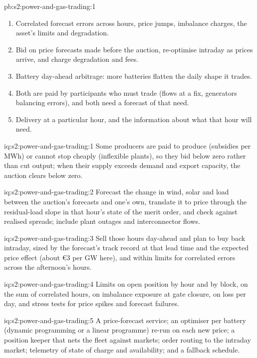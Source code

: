 \begin{solution}{pb:s2:power-and-gas-trading:1}
\begin{enumerate}
\item Correlated forecast errors across hours, price jumps, imbalance charges, the asset's limits and degradation.
\item Bid on price forecasts made before the auction, re-optimise intraday as prices arrive, and charge degradation and fees.
\item Battery day-ahead arbitrage: more batteries flatten the daily shape it trades.
\item Both are paid by participants who must trade (flows at a fix, generators balancing errors), and both need a forecast of that need.
\item Delivery at a particular hour, and the information about what that hour will need.
\end{enumerate}
\end{solution}

\begin{solution}{iq:s2:power-and-gas-trading:1}
Some producers are paid to produce (subsidies per MWh) or cannot stop cheaply (inflexible plants), so they bid below zero rather than cut output; when
their supply exceeds demand and export capacity, the auction clears below zero.
\end{solution}

\begin{solution}{iq:s2:power-and-gas-trading:2}
Forecast the change in wind, solar and load between the auction's forecasts and one's own, translate it to price through the residual-load slope in
that hour's state of the merit order, and check against realised spreads; include plant outages and interconnector flows.
\end{solution}

\begin{solution}{iq:s2:power-and-gas-trading:3}
Sell those hours day-ahead and plan to buy back intraday, sized by the forecast's track record at that lead time and the expected price effect
(about \euro3 per GW here), and within limits for correlated errors across the afternoon's hours.
\end{solution}

\begin{solution}{iq:s2:power-and-gas-trading:4}
Limits on open position by hour and by block, on the sum of correlated hours, on imbalance exposure at gate closure, on loss per day, and stress tests
for price spikes and forecast failures.
\end{solution}

\begin{solution}{iq:s2:power-and-gas-trading:5}
A price-forecast service; an optimiser per battery (dynamic programming or a linear programme) re-run on each new price; a position keeper that
nets the fleet against markets; order routing to the intraday market; telemetry of state of charge and availability; and a fallback schedule.
\end{solution}

